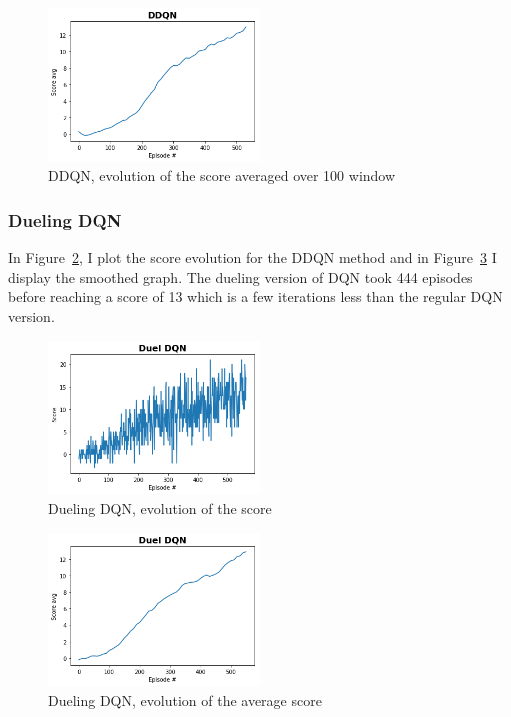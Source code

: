 \documentclass[12pt]{article}
\begin{document}
\begin{figure}[H]
 \centering
  \includegraphics[width=0.5\textwidth]{../PNG/ddqn_smooth.png}
  \caption{DDQN, evolution of the score averaged over 100 window}
  \label{fig:DDQN_av}
\end{figure}


\subsubsection{Dueling DQN}

In Figure~\ref{fig:Duel_DQN}, I plot the score evolution for the DDQN method and in Figure~\ref{fig:Duel_DQN_av} I display the smoothed graph. The dueling version of DQN took 444 episodes before reaching a score of 13 which is a few iterations less than the regular DQN version.

\begin{figure}[H]
 \centering
  \includegraphics[width=0.5\textwidth]{../PNG/duel_dqn.png}
  \caption{Dueling DQN, evolution of the score}
  \label{fig:Duel_DQN}
\end{figure}

\begin{figure}[H]
 \centering
  \includegraphics[width=0.5\textwidth]{../PNG/duel_dqn_smooth.png}
  \caption{Dueling DQN, evolution of the average score}
  \label{fig:Duel_DQN_av}
\end{figure}
\end{document}
